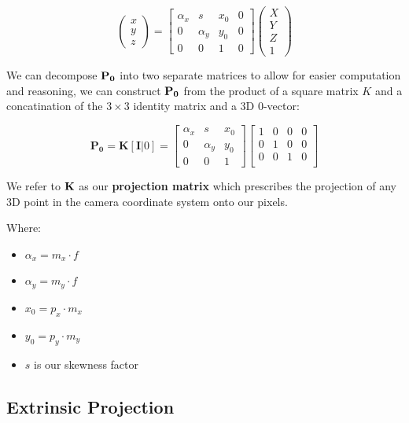 \documentclass{article}
\begin{document}
\[
  \begin{pmatrix}
    x \\ y \\z
  \end{pmatrix} =
  \begin{bmatrix}
    \alpha_{x} & s  & x_{0} & 0\\
    0 & \alpha_{y} & y_{0} & 0\\
    0 & 0 & 1 & 0
  \end{bmatrix}
  \begin{pmatrix}
    X \\ Y \\ Z \\1
  \end{pmatrix}
\]


We can decompose $\bf P_{0}$ into two separate matrices to allow for easier computation and reasoning, we can construct $\bf P_{0}$ from the product of a square matrix $K$ and a concatination of the $3\times 3$ identity matrix and a 3D 0-vector:

\[
  \mathbf{P_{0}} = \mathbf{K}[\textbf{I}|0] = \begin{bmatrix}
    \alpha_{x} & s  & x_{0} \\
    0 & \alpha_{y} & y_{0} \\
    0 & 0 & 1
  \end{bmatrix}
  \begin{bmatrix}
    1 & 0 & 0 & 0 \\
    0 & 1 & 0 & 0 \\
    0 & 0 & 1 & 0 \\
  \end{bmatrix}
\]

We refer to $\bf K$ as our \textbf{projection matrix} which prescribes the projection of any 3D point in the camera coordinate system onto our pixels.

Where:
\begin{itemize}
  \item $\alpha_{x}= m_{x} \cdot f$
  \item $\alpha_{y} = m_{y} \cdot f$
  \item $x_{0} = p_{x} \cdot m_{x}$
  \item $y_{0} = p_{y} \cdot m_{y}$
  \item $s$ is our skewness factor
\end{itemize}



\subsection{Extrinsic Projection}
\label{subsec:extrinsic-projection}
\end{document}
